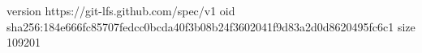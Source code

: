 version https://git-lfs.github.com/spec/v1
oid sha256:184e666fc85707fedcc0bcda40f3b08b24f3602041f9d83a2d0d8620495fc6c1
size 109201
